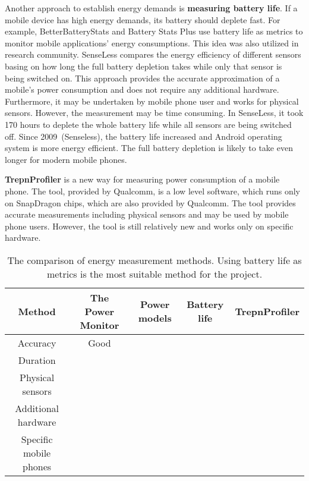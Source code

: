 Another approach to establish energy demands is \textbf{measuring battery life}. If a mobile device has high energy demands, its battery should deplete fast. For example, BetterBatteryStats \cite{googleplay:betterbatterystats} and Battery Stats Plus \cite{googleplay:batterystatsplus} use battery life as metrics to monitor mobile applications' energy consumptions. This idea was also utilized in research community. SenseLess \cite{benabdesslem:senseless} compares the energy efficiency of different sensors basing on how long the full battery depletion takes while only that sensor is being switched on. This approach provides the accurate approximation of a mobile's power consumption and does not require any additional hardware. Furthermore, it may be undertaken by mobile phone user and works for physical sensors. However, the measurement may be time consuming. In SenseLess, it took 170 hours to deplete the whole battery life while all sensors are being switched off. Since 2009\ (Senseless), the battery life increased and Android operating system is more energy efficient. The full battery depletion is likely to take even longer for modern mobile phones.

\textbf{TrepnProfiler} \cite{qualcomm:trepnprofiler} is a new way for measuring power consumption of a mobile phone. The tool, provided by Qualcomm, is a low level software, which runs only on SnapDragon chips, which are also provided by Qualcomm. The tool provides accurate measurements including physical sensors and may be used by mobile phone users. However, the tool is still relatively new and works only on specific hardware.

\begin{table}[H]
	\centering
    \begin{tabular}{| c | c | c | c | c | }
    \hline
    Method & The Power Monitor & Power models & Battery life & TrepnProfiler \\ \hline
    Accuracy & Good & & & \\ \hline
    Duration & & & & \\\hline
    Physical sensors & & & &\\ \hline
    Additional hardware & & & &\\ \hline
    Specific mobile phones & & & &\\ \hline
    \end{tabular}
    \caption{The comparison of energy measurement methods. Using battery life as metrics is the most suitable method for the project.}
	\label{table:energymeasurementmethods}
\end{table}
	
